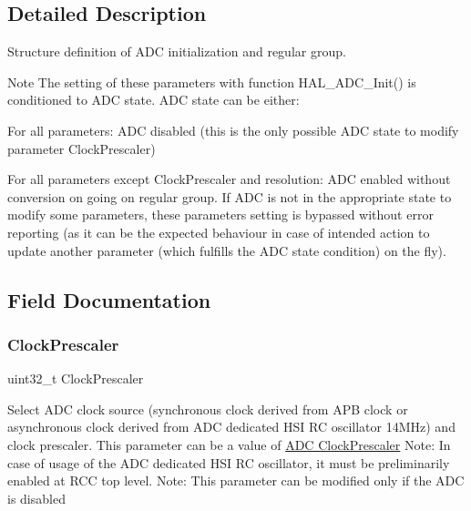 \subsection{Detailed Description}
Structure definition of A\+DC initialization and regular group. 

\begin{DoxyNote}{Note}
The setting of these parameters with function H\+A\+L\+\_\+\+A\+D\+C\+\_\+\+Init() is conditioned to A\+DC state. A\+DC state can be either\+:
\begin{DoxyItemize}
\item For all parameters\+: A\+DC disabled (this is the only possible A\+DC state to modify parameter \textquotesingle{}Clock\+Prescaler\textquotesingle{})
\item For all parameters except \textquotesingle{}Clock\+Prescaler\textquotesingle{} and \textquotesingle{}resolution\textquotesingle{}\+: A\+DC enabled without conversion on going on regular group. If A\+DC is not in the appropriate state to modify some parameters, these parameters setting is bypassed without error reporting (as it can be the expected behaviour in case of intended action to update another parameter (which fulfills the A\+DC state condition) on the fly). 
\end{DoxyItemize}
\end{DoxyNote}


\subsection{Field Documentation}
\mbox{\label{struct_a_d_c___init_type_def_ab791f8fac403d508e1c53b6f27cf1f24}} 
\subsubsection{\texorpdfstring{Clock\+Prescaler}{ClockPrescaler}}
{\footnotesize\ttfamily uint32\+\_\+t Clock\+Prescaler}

Select A\+DC clock source (synchronous clock derived from A\+PB clock or asynchronous clock derived from A\+DC dedicated H\+SI RC oscillator 14\+M\+Hz) and clock prescaler. This parameter can be a value of \hyperlink{group___a_d_c___clock_prescaler}{A\+DC Clock\+Prescaler} Note\+: In case of usage of the A\+DC dedicated H\+SI RC oscillator, it must be preliminarily enabled at R\+CC top level. Note\+: This parameter can be modified only if the A\+DC is disabled \mbox{\label{struct_a_d_c___init_type_def_a768ec42e36553ad0acb7ad029462a59d}} 
